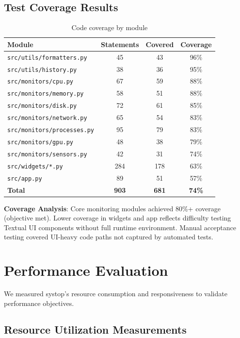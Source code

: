 \documentclass[12pt,a4paper,oneside]{report}
\begin{document}
\subsection{Test Coverage Results}

\begin{table}[h]
\centering
\caption{Code coverage by module}
\label{tab:coverage}
\small
\begin{tabular}{|l|c|c|c|}
\hline
\textbf{Module} & \textbf{Statements} & \textbf{Covered} & \textbf{Coverage} \\
\hline
\texttt{src/utils/formatters.py} & 45 & 43 & 96\% \\
\texttt{src/utils/history.py} & 38 & 36 & 95\% \\
\texttt{src/monitors/cpu.py} & 67 & 59 & 88\% \\
\texttt{src/monitors/memory.py} & 58 & 51 & 88\% \\
\texttt{src/monitors/disk.py} & 72 & 61 & 85\% \\
\texttt{src/monitors/network.py} & 65 & 54 & 83\% \\
\texttt{src/monitors/processes.py} & 95 & 79 & 83\% \\
\texttt{src/monitors/gpu.py} & 48 & 38 & 79\% \\
\texttt{src/monitors/sensors.py} & 42 & 31 & 74\% \\
\texttt{src/widgets/*.py} & 284 & 178 & 63\% \\
\texttt{src/app.py} & 89 & 51 & 57\% \\
\hline
\textbf{Total} & \textbf{903} & \textbf{681} & \textbf{74\%} \\
\hline
\end{tabular}
\end{table}

\textbf{Coverage Analysis}: Core monitoring modules achieved 80\%+ coverage (objective met). Lower coverage in widgets and app reflects difficulty testing Textual UI components without full runtime environment. Manual acceptance testing covered UI-heavy code paths not captured by automated tests.

\section{Performance Evaluation}
\label{sec:performance-evaluation}

We measured systop's resource consumption and responsiveness to validate performance objectives.

\subsection{Resource Utilization Measurements}
\end{document}
